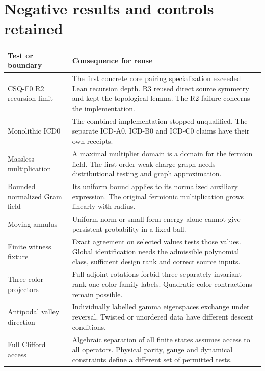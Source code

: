 \section{Negative results and controls retained}
\begin{longtable}{@{}p{}p{}@{}}
\toprule Test or boundary & Consequence for reuse\\
\midrule
\endhead
CSQ-F0 R2 recursion limit & The first concrete core pairing specialization exceeded Lean recursion depth. R3 reused direct source symmetry and kept the topological lemma. The R2 failure concerns the implementation.\\
Monolithic ICD0 & The combined implementation stopped unqualified. The separate ICD-A0, ICD-B0 and ICD-C0 claims have their own receipts.\\
Massless multiplication & A maximal multiplier domain is a domain for the fermion field. The first-order weak charge graph needs distributional testing and graph approximation.\\
Bounded normalized Gram field & Its uniform bound applies to its normalized auxiliary expression. The original fermionic multiplication grows linearly with radius.\\
Moving annulus & Uniform norm or small form energy alone cannot give persistent probability in a fixed ball.\\
Finite witness fixture & Exact agreement on selected values tests those values. Global identification needs the admissible polynomial class, sufficient design rank and correct source inputs.\\
Three color projectors & Full adjoint rotations forbid three separately invariant rank-one color family labels. Quadratic color contractions remain possible.\\
Antipodal valley direction & Individually labelled gamma eigenspaces exchange under reversal. Twisted or unordered data have different descent conditions.\\
Full Clifford access & Algebraic separation of all finite states assumes access to all operators. Physical parity, gauge and dynamical constraints define a different set of permitted tests.\\
\bottomrule
\end{longtable}


